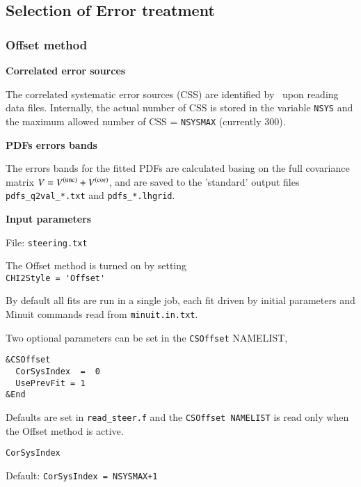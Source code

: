 \subsection{Selection of Error treatment}

\subsubsection {Offset method}


{\bf {Correlated error sources}}

The correlated systematic error sources (CSS) are identified by \fitter\ upon reading data files.
Internally, the actual number of CSS 
is stored in the variable \verb'NSYS'
and the maximum allowed number of CSS = \verb'NSYSMAX' (currently 300).
\vspace{0.4cm}

{\bf {PDFs errors bands}}

The errors bands for the fitted PDFs are calculated 
basing on the full covariance matrix $V = \Vstat + \Vsys$,
and are saved to the 'standard' output files
\verb'pdfs_q2val_*.txt' and \verb'pdfs_*.lhgrid'.
\vspace{0.4cm}

{\bf {Input parameters}}

File: \verb'steering.txt'

The Offset method is turned on by setting\\
\verb:CHI2Style = 'Offset':

By default all fits are run in a single job, each fit driven by initial parameters and Minuit commands
read from \verb'minuit.in.txt'.

Two optional parameters can be set in the \verb'CSOffset' NAMELIST, \eg
\vspace*{-2.5ex}
\begin{verbatim}
&CSOffset
  CorSysIndex  =  0
  UsePrevFit = 1
&End
\end{verbatim}
\vspace*{-1ex}
Defaults are set in \verb'read_steer.f'
and the \verb'CSOffset NAMELIST' is read only when the Offset method is active.
\vspace{0.4cm}

{\tt CorSysIndex}

Default: \verb'CorSysIndex = NSYSMAX+1'

